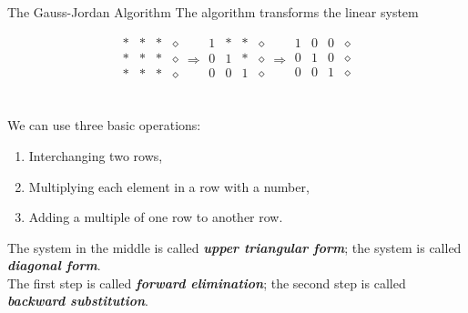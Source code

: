 \documentclass[hyperref={pdfpagelabels=true}]{beamer}
\newcommand{\highlightg}[1]{\textcolor[rgb]{0.1,0.5,0.3}{\emph{\textbf{#1}}}}
\newcommand{\<}{\langle}
\renewcommand{\>}{\rangle}
\begin{document}
\begin{frame}{The Gauss-Jordan Algorithm}
    The algorithm transforms the linear system 
    \begin{spacing}{0.5}
    \[
        \begin{array}{ccc|c}
            * & * & * & \diamond \\ 
            * & * & * & \diamond \\ 
            * & * & * & \diamond \\
        \end{array}
        \Rightarrow
        \begin{array}{ccc|c}
            1 & * & * & \diamond \\ 
            0 & 1 & * & \diamond \\ 
            0 & 0 & 1 & \diamond \\
        \end{array}
        \Rightarrow
        \begin{array}{ccc|c}
            1 & 0 & 0 & \diamond \\ 
            0 & 1 & 0 & \diamond \\ 
            0 & 0 & 1 & \diamond \\
        \end{array}
    \]
    \end{spacing}
    \quad
    \\We can use three basic operations:
    \begin{enumerate}
        \item Interchanging two rows,
        \item Multiplying each element in a row with a number,
        \item Adding a multiple of one row to another row.
    \end{enumerate}
    The system in the middle is called \highlightg{upper triangular form}; the system is called \highlightg{diagonal form}.\\
    The first step is called \highlightg{forward elimination}; the second step is called \highlightg{backward substitution}.
\end{frame}
\end{document}
